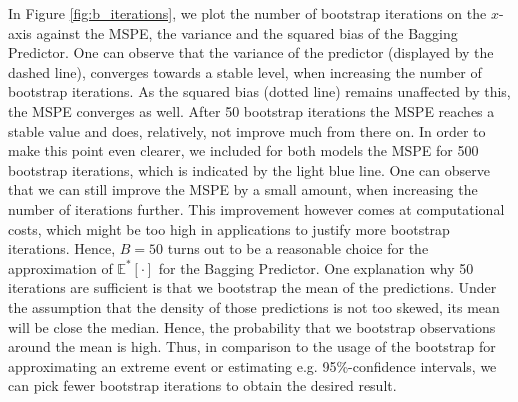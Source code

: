 In Figure \ref{fig:b_iterations}, we plot the number of bootstrap iterations on the $x$-axis against the MSPE, the variance and the squared bias of the Bagging Predictor.
One can observe that the variance of the predictor (displayed by the dashed line), converges towards a stable level, when increasing the number of bootstrap iterations. As the squared bias (dotted line) remains unaffected by this, the MSPE converges as well. After 50 bootstrap iterations the MSPE reaches a stable value and does, relatively, not improve much from there on. In order to make this point even clearer, we included for both models the MSPE for 500 bootstrap iterations, which is indicated by the light blue line. One can observe that we can still improve the MSPE by a small amount, when increasing the number of iterations further. This improvement however comes at computational costs, which might be too high in applications to justify more bootstrap iterations. \newline
Hence, $B=50$ turns out to be a reasonable choice for the approximation of $\mathbb{E}^{*}[\cdot]$ for the Bagging Predictor.
One explanation why 50 iterations are sufficient is that we bootstrap the mean of the predictions. Under the assumption that the density of those predictions is not too skewed, its mean will be close the median. Hence, the probability that we bootstrap observations around the mean is high. Thus, in comparison to the usage of the bootstrap for approximating an extreme event or estimating e.g. 95\%-confidence intervals, we can pick fewer bootstrap iterations to obtain the desired result.

